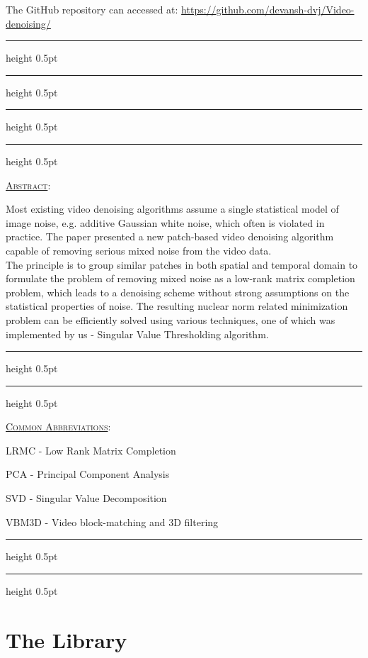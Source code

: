\documentclass[fleqn, 11pt]{article}
\newcommand{\myline}{
  \par
  \kern3pt %
  \hrule height 0.5pt
  \kern2pt %
  \hrule height 0.5pt
  \kern3pt %
  \par
}
\begin{document}
The GitHub repository can accessed at: \url{https://github.com/devansh-dvj/Video-denoising/}

\vspace{7pt}

\myline

\newpage
\vspace{-2em}
\myline

\vspace{10pt}

\underline{\large {\textsc{Abstract}}}: 

\medskip  

Most existing video denoising algorithms assume a single statistical model of image noise, e.g. additive Gaussian white noise, which often is violated in practice. The paper presented a new patch-based video denoising algorithm capable of removing serious mixed noise from the video data. \\

The principle is to group similar patches in both spatial and temporal domain to formulate the problem of removing mixed noise as a low-rank matrix completion problem, which leads to a denoising scheme without strong assumptions on the statistical properties of noise. The resulting nuclear norm related minimization problem can be efficiently solved using various techniques, one of which was implemented by us - Singular Value Thresholding algorithm.\\

\vspace{7pt}

\myline 

\vspace{10pt}

\underline{\large {\textsc{Common Abbreviations}}}: 

\medskip  

LRMC - Low Rank Matrix Completion

PCA - Principal Component Analysis

SVD - Singular Value Decomposition

VBM3D - Video block-matching and 3D filtering

\vspace{7pt}

\myline 


\newpage

\section*{The Library}
\end{document}
